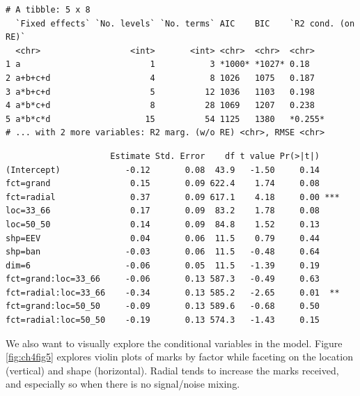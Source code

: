 \documentclass{monashthesis}
\begin{document}
\begin{verbatim}
# A tibble: 5 x 8
  `Fixed effects` `No. levels` `No. terms` AIC    BIC    `R2 cond. (on RE)`
  <chr>                  <int>       <int> <chr>  <chr>  <chr>             
1 a                          1           3 *1000* *1027* 0.18              
2 a+b+c+d                    4           8 1026   1075   0.187             
3 a*b+c+d                    5          12 1036   1103   0.198             
4 a*b*c+d                    8          28 1069   1207   0.238             
5 a*b*c*d                   15          54 1125   1380   *0.255*           
# ... with 2 more variables: R2 marg. (w/o RE) <chr>, RMSE <chr>
\end{verbatim}

\begin{verbatim}
                     Estimate Std. Error    df t value Pr(>|t|)    
(Intercept)             -0.12       0.08  43.9   -1.50     0.14    
fct=grand                0.15       0.09 622.4    1.74     0.08    
fct=radial               0.37       0.09 617.1    4.18     0.00 ***
loc=33_66                0.17       0.09  83.2    1.78     0.08    
loc=50_50                0.14       0.09  84.8    1.52     0.13    
shp=EEV                  0.04       0.06  11.5    0.79     0.44    
shp=ban                 -0.03       0.06  11.5   -0.48     0.64    
dim=6                   -0.06       0.05  11.5   -1.39     0.19    
fct=grand:loc=33_66     -0.06       0.13 587.3   -0.49     0.63    
fct=radial:loc=33_66    -0.34       0.13 585.2   -2.65     0.01  **
fct=grand:loc=50_50     -0.09       0.13 589.6   -0.68     0.50    
fct=radial:loc=50_50    -0.19       0.13 574.3   -1.43     0.15    
\end{verbatim}

We also want to visually explore the conditional variables in the model. Figure \ref{fig:ch4fig5} explores violin plots of marks by factor while faceting on the location (vertical) and shape (horizontal). Radial tends to increase the marks received, and especially so when there is no signal/noise mixing.
\end{document}

